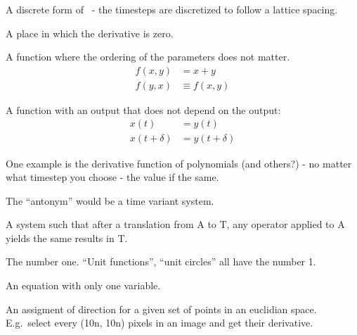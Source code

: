 \begin{definition}
    A discrete form of~ - the timesteps are discretized to follow
    a lattice spacing.
\end{definition}

\begin{definition}
    A place in which the derivative is zero.
\end{definition}

\begin{definition}
    A function where the ordering of the parameters does not matter.
    \begin{align}
        f(x,y) &= x + y \\
        f(y,x) &\equiv f(x,y)
    \end{align}
\end{definition}

\begin{definition}\label{TIS}
    A function with an output that does not depend on the output:
    \begin{align}
        x(t) &= y(t) \\
        x(t + \delta) &= y(t + \delta)
    \end{align}

    One example is the derivative function of polynomials (and others?) -
    no matter what timestep you choose - the value if the same.

    The ``antonym'' would be a time variant system.
\end{definition}

\begin{definition}
    A system such that after a translation from A to T, any operator
    applied to A yields the same results in T.
\end{definition}

\begin{definition}[Unity]
    The number one. ``Unit functions'', ``unit circles'' all have the number 1.
\end{definition}

\begin{definition}[Univariate]
    An equation with only one variable.
\end{definition}

\begin{definition}\label{vectorfield}
    An assigment of direction for a given set of points in an euclidian space.
    E.g.\ select every (10n, 10n) pixels in an image and get their derivative.
\end{definition}

